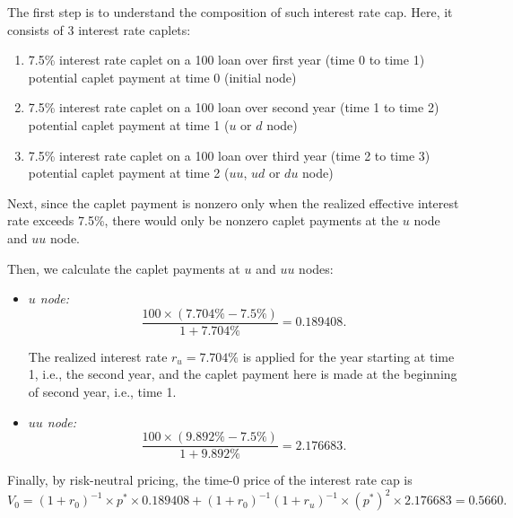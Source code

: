 \begin{enumerate}
The first step is to understand the composition of such interest rate cap.
Here, it consists of 3 interest rate caplets:
\begin{enumerate}
\item 7.5\% interest rate caplet on a 100 loan over first year (time 0 to time
1)  potential caplet payment at time 0 (initial node)
\item 7.5\% interest rate caplet on a 100 loan over second year (time 1 to time 2)
 potential caplet payment at time 1 (\(u\) or \(d\) node)
\item 7.5\% interest rate caplet on a 100 loan over third year (time 2 to time 3)
 potential caplet payment at time 2 (\(uu\), \(ud\) or \(du\) node)
\end{enumerate}

Next, since the caplet payment is nonzero only when the realized effective
interest rate exceeds 7.5\%, there would only be nonzero caplet payments at the
\(u\) node and \(uu\) node.

Then, we calculate the caplet payments at \(u\) and \(uu\) nodes:
\begin{itemize}
\item \emph{\(u\) node:}
\[
\frac{100\times (7.704\%-7.5\%)}{1+7.704\%}=0.189408.
\]
\begin{note}
The realized interest rate \(r_u=7.704\%\) is applied for the year starting at
time 1, i.e., the second year, and the caplet payment here is made at the
beginning of second year, i.e., time 1.
\end{note}
\item \emph{\(uu\) node:}
\[
\frac{100\times (9.892\%-7.5\%)}{1+9.892\%}=2.176683.
\]
\end{itemize}
\begin{center}
\end{center}
Finally, by risk-neutral pricing, the time-0 price of the interest rate cap is
\[
V_0=(1+r_0)^{-1}\times p^*\times 0.189408+(1+r_0)^{-1}(1+r_u)^{-1}\times (p^*)^{2}\times 2.176683
=0.5660.
\]
\end{enumerate}
